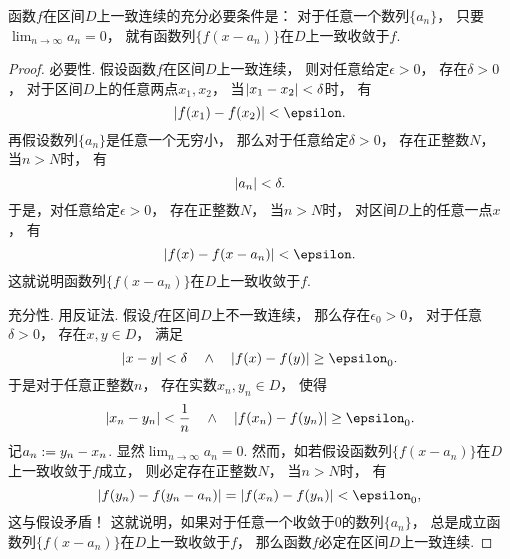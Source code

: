 \begin{example}
函数\(f\)在区间\(D\)上一致连续的充分必要条件是：
对于任意一个数列\(\{a_n\}\)，
只要\(\lim_{n\to\infty} a_n = 0\)，
就有函数列\(\{f(x-a_n)\}\)在\(D\)上一致收敛于\(f\).
\begin{proof}
必要性.
假设函数\(f\)在区间\(D\)上一致连续，
则对任意给定\(\epsilon>0\)，
存在\(\delta>0\)，
对于区间\(D\)上的任意两点\(x_1,x_2\)，
当\(\abs{x_1-x_2}<\delta\)时，
有\begin{equation*}
	\abs{f(x_1)-f(x_2)}<\epsilon.
\end{equation*}
再假设数列\(\{a_n\}\)是任意一个无穷小，
那么对于任意给定\(\delta>0\)，
存在正整数\(N\)，
当\(n>N\)时，
有\begin{equation*}
	\abs{a_n} < \delta.
\end{equation*}
于是，对任意给定\(\epsilon>0\)，
存在正整数\(N\)，
当\(n>N\)时，
对区间\(D\)上的任意一点\(x\)，
有\begin{equation*}
	\abs{f(x)-f(x-a_n)}<\epsilon.
\end{equation*}
这就说明函数列\(\{f(x-a_n)\}\)在\(D\)上一致收敛于\(f\).

充分性.
用反证法.
假设\(f\)在区间\(D\)上不一致连续，
那么存在\(\epsilon_0>0\)，
对于任意\(\delta>0\)，
存在\(x,y \in D\)，
满足\begin{equation*}
	\abs{x-y}<\delta
	\quad\land\quad
	\abs{f(x)-f(y)}\geq\epsilon_0.
\end{equation*}
于是对于任意正整数\(n\)，
存在实数\(x_n,y_n \in D\)，
使得\begin{equation*}
	\abs{x_n-y_n}<\frac1n
	\quad\land\quad
	\abs{f(x_n)-f(y_n)}\geq\epsilon_0.
\end{equation*}
记\(a_n := y_n - x_n\).
显然\(\lim_{n\to\infty} a_n = 0\).
然而，如若假设函数列\(\{f(x-a_n)\}\)在\(D\)上一致收敛于\(f\)成立，
则必定存在正整数\(N\)，
当\(n>N\)时，
有\begin{equation*}
	\abs{f(y_n)-f(y_n-a_n)}
	=\abs{f(x_n)-f(y_n)}
	<\epsilon_0,
\end{equation*}
这与假设矛盾！
这就说明，如果对于任意一个收敛于\(0\)的数列\(\{a_n\}\)，
总是成立函数列\(\{f(x-a_n)\}\)在\(D\)上一致收敛于\(f\)，
那么函数\(f\)必定在区间\(D\)上一致连续.
\end{proof}
\end{example}
